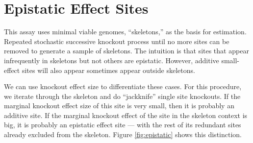 \section{Epistatic Effect Sites}



This assay uses minimal viable genomes, ``skeletons,'' as the basis for estimation.
Repeated stochastic successive knockout process until no more sites can be removed to generate a sample of skeletons.
The intuition is that sites that appear infrequently in skeletons but not others are epistatic.
However, additive small-effect sites will also appear sometimes appear outside skeletons.

We can use knockout effect size to differentiate these cases.
For this procedure, we iterate through the skeleton and do ``jackknife'' single site knockouts.
If the marginal knockout effect size of this site is very small, then it is probably an additive site.
If the marginal knockout effect of the site in the skeleton context is big, it is probably an epistatic effect site --- with the rest of its redundant sites already excluded from the skeleton.
Figure \ref{fig:epistatic} shows this distinction.










